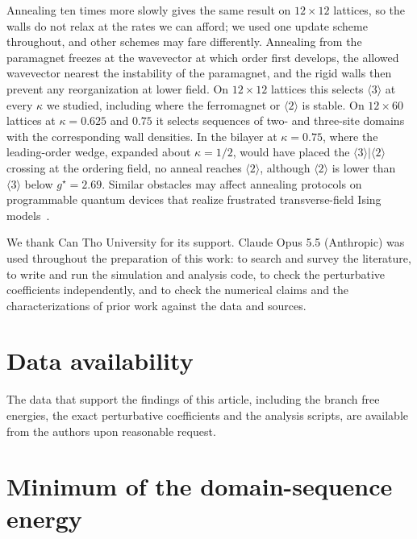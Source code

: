 \documentclass[
 aps,prb,
 twocolumn,
 superscriptaddress,
 longbibliography,
 nofootinbib,
 floatfix
]{revtex4-2}
\begin{document}
Annealing ten times more slowly gives the same result on $12\times12$ lattices, so the walls do not relax at the rates
we can afford; we used one update scheme throughout, and other schemes may fare differently. Annealing from the paramagnet freezes at the
wavevector at which order first develops, the allowed wavevector nearest the instability of the paramagnet, and
the rigid walls then prevent any reorganization at lower field. On $12\times12$ lattices this selects $\langle3\rangle$
at every $\kappa$ we studied, including where the ferromagnet or $\langle2\rangle$ is stable. On $12\times60$ lattices at
$\kappa=0.625$ and $0.75$ it selects sequences of two- and three-site domains with the corresponding wall densities.
In the bilayer at $\kappa=0.75$, where the leading-order wedge, expanded about $\kappa=1/2$, would have placed the $\langle3\rangle|\langle2\rangle$
crossing at the ordering field, no anneal reaches $\langle2\rangle$, although $\langle2\rangle$ is lower than $\langle3\rangle$
below $g^\star=2.69$. Similar obstacles may affect annealing protocols on programmable quantum devices that realize
frustrated transverse-field Ising models~\cite{king2018observation}.

\begin{acknowledgments}
We thank Can Tho University for its support. Claude Opus 5.5 (Anthropic) was used throughout the preparation of this
work: to search and survey the literature, to write and run the simulation and analysis code, to check the perturbative
coefficients independently, and to check the numerical claims and the characterizations of prior work against the data
and sources.
\end{acknowledgments}

\section*{Data availability}
The data that support the findings of this article, including the branch free energies, the exact perturbative
coefficients and the analysis scripts, are available from the authors upon reasonable request.

\appendix

\section{Minimum of the domain-sequence energy}
\label{app:pt}
\end{document}
